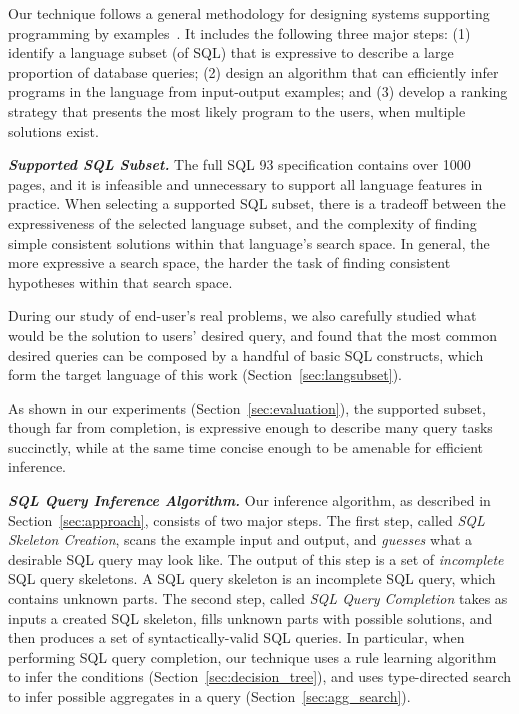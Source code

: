 
Our technique follows a general methodology for designing
systems supporting programming by examples~\cite{Harris:2011}.
It includes the following three major steps:
(1) identify a language subset (of SQL) that is expressive to
describe a large proportion of %
database queries; (2) design an algorithm that
can efficiently infer programs in the language from input-output
examples; and (3) develop a ranking strategy that presents
the most likely program to the users, when multiple solutions exist.

\vspace{1mm}
\noindent \textbf{\textit{Supported SQL Subset.}}
The full SQL 93 specification contains over 1000 pages, and it is
infeasible and unnecessary to support all language features in practice.
When selecting a supported SQL subset, there is a tradeoff
between the expressiveness of the selected language subset,
and the complexity of finding simple consistent solutions
within that language's search space.  In general, the more expressive a search
space, the harder the task of finding consistent hypotheses within
that search space. 

During our study of end-user's real problems, we also carefully studied what would
be the solution to users' desired query, and found that the most common
desired queries can be composed by a handful of basic SQL constructs,
which form the target language of this work (Section~\ref{sec:langsubset}).

As shown in our experiments (Section~\ref{sec:evaluation}), the supported subset, though far from completion, is expressive
enough to describe many query tasks succinctly, while at the same time concise
enough to be amenable for efficient inference. 



\vspace{1mm}
\noindent \textbf{\textit{SQL Query Inference Algorithm.}} Our inference
algorithm, as described in Section~\ref{sec:approach}, consists of two
major steps. The first step, called \textit{SQL Skeleton Creation}, scans
the example input and output, and \textit{guesses} what a desirable
SQL query may look like. The output of this step is a set of \textit{incomplete} SQL
query skeletons. A SQL query skeleton is an incomplete SQL query,
which contains unknown parts. The second step,
called \textit{SQL Query Completion} takes as inputs a created
SQL skeleton, fills unknown parts with possible solutions, and then produces a set of
syntactically-valid SQL queries. In particular, when performing
SQL query completion, our technique uses a rule learning algorithm
to infer the conditions (Section~\ref{sec:decision_tree}), and uses 
type-directed search to infer possible aggregates in a query (Section~\ref{sec:agg_search}).

